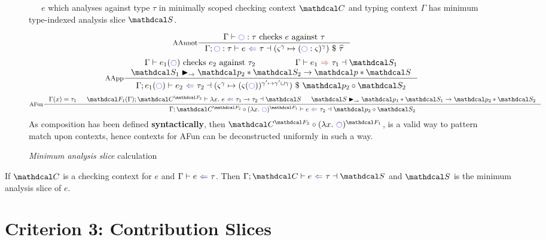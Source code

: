 \begin{figure}[h]
\ \ \ $e$ which analyses against type $\tau$ in minimally scoped checking context $\C$ and typing context $\Gamma$ has minimum type-indexed analysis slice $\S$.

\[\inference[AAnnot]{\Gamma \vdash \cmark : \tau \text{ checks } e \text{ against } \tau}{\analysisslice{\cmark : \tau}{e}{\tau}{(\varsigma^\gamma \mapsto (\cmark : \varsigma)^\gamma)\ \$\ \widehat{\tau}}}\]
\[\inference[AApp]{\Gamma \vdash e_1(\cmark) \text{ checks } e_2 \text{ against } \tau_2 & \synthesisslice{e_1}{\tau_1}{\S_1}\\ \S_1 \funmatch \p_2*\S_2 \to \p*\S}{\analysisslice{e_1(\cmark)}{e_2}{\tau_2}{(\varsigma^\gamma \mapsto (\varsigma(\cmark))^{\gamma' \mapsto \gamma' \sqcup \gamma})\ \$\ \p_2 \circ \S_2}}\]
\[\inference[AFun]{\Gamma(x) = \tau_1 & \analysisslice[\F_1(\Gamma)]{\C^{\F_2}}{\lambda x.\ e}{\tau_1 \to \tau_2}{\S} & \S \funmatch \p_1*\S_1 \to \p_2*\S_2}{\analysisslice[\Gamma]{\C^{\F_2} \circ (\lambda x.\ \cmark)^{\F_1}}{e}{\tau_2}{\p_2 \circ \S_2}}\]
As composition has been defined \textbf{syntactically}, then $\C^{\F_2} \circ (\lambda x.\ \cmark)^{\F_1}$, is a valid way to pattern match upon contexts, hence contexts for AFun can be deconstructed uniformly in such a way.
\caption{\textit{Minimum analysis slice} calculation}
\label{fig:AnalsisSlices}
\end{figure}

\begin{conjecture}[Correctness]\label{conj:AnalysisSliceCorrectness}
If $\C$ is a checking context for $e$ and $\analysis{e}{\tau}$. Then $\analysisslice{\C}{e}{\tau}{\S}$ and $\S$ is the minimum analysis slice of $e$.
\end{conjecture}

\section{Criterion 3: Contribution Slices}

